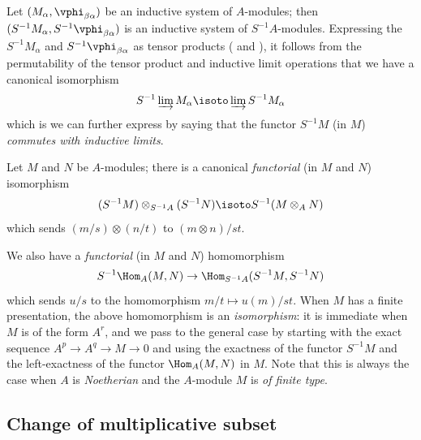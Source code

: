 \begin{env}[1.3.3]
\label{0.1.3.3}
Let $(M_\alpha,\vphi_{\beta\alpha})$ be an inductive system of $A$-modules; then
$(S^{-1}M_\alpha,S^{-1}\vphi_{\beta\alpha})$ is an inductive system of
$S^{-1}A$-modules. Expressing the $S^{-1}M_\alpha$ and
$S^{-1}\vphi_{\beta\alpha}$ as tensor products ( and
), it follows from the permutability of the tensor product and
inductive limit operations that we have a canonical isomorphism
\[
  S^{-1}\varinjlim M_\alpha\isoto\varinjlim S^{-1}M_\alpha
\]
which is we can further express by saying that the functor $S^{-1}M$ (in $M$)
\emph{commutes with inductive limits}.
\end{env}

\begin{env}[1.3.4]
\label{0.1.3.4}
Let $M$ and $N$ be $A$-modules; there is a canonical \emph{functorial} (in $M$ and $N$) isomorphism
\[
  (S^{-1}M)\otimes_{S^{-1}A}(S^{-1}N)\isoto S^{-1}(M\otimes_A N)
\]
which sends $(m/s)\otimes(n/t)$ to $(m\otimes n)/st$.
\end{env}

\begin{env}[1.3.5]
\label{0.1.3.5}
We also have a \emph{functorial} (in $M$ and $N$) homomorphism
\[
  S^{-1}\Hom_A(M,N)\to\Hom_{S^{-1}A}(S^{-1}M,S^{-1}N)
\]
which sends $u/s$ to the homomorphism $m/t\mapsto u(m)/st$. When $M$ has a
finite presentation, the above homomorphism is an \emph{isomorphism}: it is
immediate when $M$ is of the form $A^r$, and we pass to the general case by
starting with the exact sequence $A^p\to A^q\to M\to 0$ and using the
exactness of the functor $S^{-1}M$ and the left-exactness of the functor
$\Hom_A(M,N)$ in $M$. Note that this is always the case when $A$ is
\emph{Noetherian} and the $A$-module $M$ is \emph{of finite type}.
\end{env}

\subsection{Change of multiplicative subset}
\label{subsection:0.1.4}

